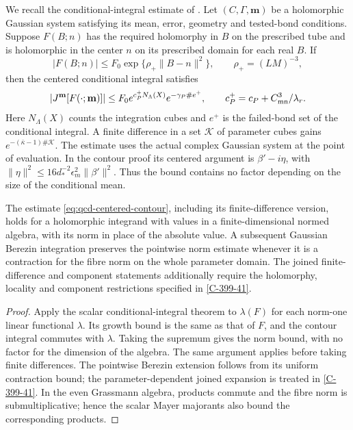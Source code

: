 \documentclass[11pt,letterpaper,reqno]{amsart}
\makeatletter
\theoremstyle{definition}
\newcommand{\ms@minorstart}{%
  \pushQED{\qed}\renewcommand{\qedsymbol}{$\blacksquare$}}
\newenvironment{lemma}[1][]{\ms@minorstart\ms@lemma[#1]}
  {\popQED\endms@lemma}
\theoremstyle{remark}
\makeatother
\begin{document}
We recall the conditional-integral estimate of
\cite[Proposition~75.1, Lemma~75.2 and Proposition~75.3]{YMM1}.
Let $(C,\Gamma,\mathbf m)$
be a holomorphic Gaussian system satisfying its mean, error,
geometry and tested-bond conditions. Suppose $F(B;n)$ has the
required holomorphy in $B$ on the prescribed tube and is
holomorphic in the center $n$ on its prescribed domain for
each real $B$. If
\[
 |F(B;n)|\le F_0\exp\{\rho_+\|B-n\|^2\},
 \qquad \rho_+=(LM)^{-3},
\]
then the centered conditional integral satisfies
\begin{equation}\label{eq:qcd-centered-contour}
 |J^{\mathbf m}[F(\cdot;\mathbf m)]|
 \le F_0 e^{c_P^+N_\Lambda(X)}e^{-\gamma_P\#e^+},
 \qquad c_P^+=c_P+C_{\rm mn}^3/\lambda_r.
\end{equation}
Here $N_\Lambda(X)$ counts the integration cubes and $e^+$ is
the failed-bond set of the conditional integral. A finite
difference in a set $\mathcal K$ of parameter cubes gains
$e^{-(\bar\kappa-1)\#\mathcal K}$. The estimate uses the
actual complex Gaussian system at the point of evaluation.
In the contour proof its centered argument is $\beta'-i\eta$,
with $\|\eta\|^2\le16d_*^{-2}\epsilon_m^2\|\beta'\|^2$.
Thus the bound contains no factor depending on the size of
the conditional mean.

\begin{lemma}[Algebra-valued conditional integration]
\label{lem:qcd-centered-interface}
The estimate \eqref{eq:qcd-centered-contour}, including its
finite-difference version, holds for a holomorphic integrand
with values in a finite-dimensional normed algebra, with its
norm in place of the absolute value. A subsequent Gaussian
Berezin integration preserves the pointwise norm estimate
whenever it is a contraction for the fibre norm on the whole
parameter domain. The joined finite-difference and component
statements additionally require the holomorphy, locality and
component restrictions specified in \cref{C-399-41}.
\end{lemma}

\begin{proof}
Apply the scalar conditional-integral theorem to
$\lambda(F)$ for each norm-one linear functional $\lambda$.
Its growth bound is the same as that of $F$, and the contour
integral commutes with $\lambda$. Taking the supremum gives
the norm bound, with no factor for the dimension of the algebra.
The same argument applies before taking finite differences.
The pointwise Berezin extension follows from its uniform
contraction bound; the parameter-dependent joined expansion
is treated in \cref{C-399-41}. In the even Grassmann algebra, products
commute and the fibre norm is submultiplicative; hence the
scalar Mayer majorants also bound the corresponding products.
\end{proof}
\end{document}
